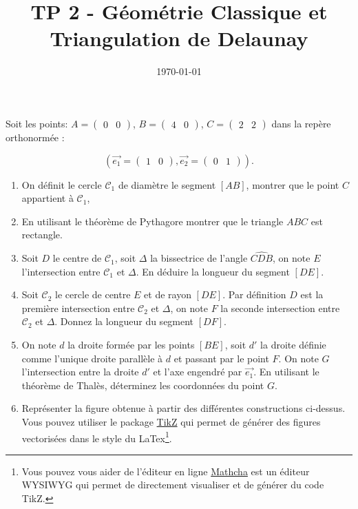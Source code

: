 \documentclass[a4paper,12pt]{article}
\title{TP 2 - Géométrie Classique et Triangulation de Delaunay}
\author{}
\date{\today}
\theoremstyle{definition}
\begin{document}
\makeonlytitle

\label{exo:theorique}

Soit les points: $A=\begin{pmatrix}0 & 0\end{pmatrix}$, $B=\begin{pmatrix}4 & 0\end{pmatrix}$, $C=\begin{pmatrix}2 & 2\end{pmatrix}$ dans la repère orthonormée :

\begin{equation*}
\left(\vec{e_1} = \begin{pmatrix}1 & 0\end{pmatrix}, \vec{e_2} = \begin{pmatrix}0 & 1\end{pmatrix}\right).
\end{equation*}

\begin{enumerate}
  \item On définit le cercle $\mathcal{C}_1$ de diamètre le segment $[AB]$, montrer que le point $C$ appartient à $\mathcal{C}_1$, 
  \item En utilisant le théorème de Pythagore montrer que le triangle $ABC$ est rectangle.
  \item Soit $D$ le centre de $\mathcal{C}_1$, soit $\Delta$ la bissectrice de l'angle $\widehat{CDB}$, on note $E$ l'intersection entre $\mathcal{C}_1$ et $\Delta$. En déduire la longueur du segment $[DE]$. 
  \item Soit $\mathcal{C}_2$ le cercle de centre $E$ et de rayon $[DE]$. Par définition $D$ est la première intersection entre $\mathcal{C}_2$ et $\Delta$, on note $F$ la seconde intersection entre $\mathcal{C}_2$ et $\Delta$. Donnez la longueur du segment $[DF]$.
  \item On note $d$ la droite formée par les points $[BE]$, soit $d'$ la droite définie comme l'unique droite parallèle à $d$ et passant par le point $F$. On note $G$ l'intersection entre la droite $d'$ et l'axe engendré par $\vec{e_1}$. En utilisant le théorème de Thalès, déterminez les coordonnées du point $G$.
  \item Représenter la figure obtenue à partir des différentes constructions ci-dessus. Vous pouvez utiliser le package \href{https://www.overleaf.com/learn/latex/TikZ_package}{TikZ} qui permet de générer des figures vectorisées dans le style du LaTex\footnote{Vous pouvez vous aider de l'éditeur en ligne \href{https://www.mathcha.io/}{Mathcha} est un éditeur WYSIWYG qui permet de directement visualiser et de générer du code TikZ.}.  
\end{enumerate}
\end{document}
